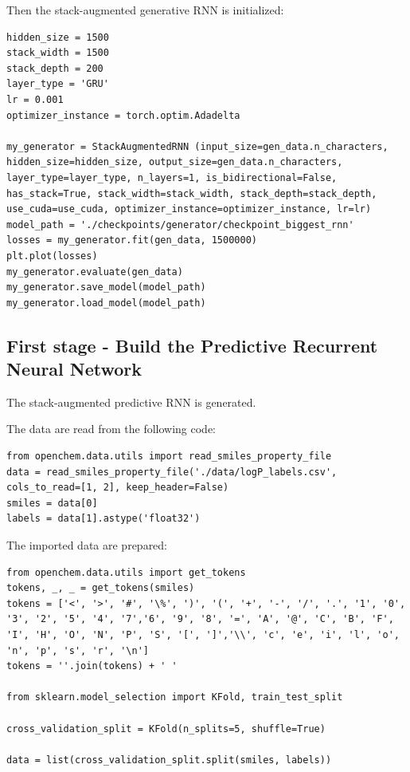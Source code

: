 \documentclass[a4paper]{article}
\begin{document}
Then the stack-augmented generative RNN is initialized:

\begin{lstlisting}
hidden_size = 1500
stack_width = 1500
stack_depth = 200
layer_type = 'GRU'
lr = 0.001
optimizer_instance = torch.optim.Adadelta

my_generator = StackAugmentedRNN (input_size=gen_data.n_characters, hidden_size=hidden_size, output_size=gen_data.n_characters, layer_type=layer_type, n_layers=1, is_bidirectional=False, has_stack=True, stack_width=stack_width, stack_depth=stack_depth, use_cuda=use_cuda, optimizer_instance=optimizer_instance, lr=lr)
model_path = './checkpoints/generator/checkpoint_biggest_rnn'
losses = my_generator.fit(gen_data, 1500000)
plt.plot(losses)
my_generator.evaluate(gen_data)
my_generator.save_model(model_path)
my_generator.load_model(model_path)
\end{lstlisting}

\subsection{First stage - Build the Predictive Recurrent Neural Network}\label{sec:First stage - Build the Predictive Recurrent Neural Network}

The stack-augmented predictive RNN is generated. 

The data are read from the following code:

\begin{lstlisting}
from openchem.data.utils import read_smiles_property_file
data = read_smiles_property_file('./data/logP_labels.csv', cols_to_read=[1, 2], keep_header=False)
smiles = data[0]
labels = data[1].astype('float32')
\end{lstlisting}

The imported data are prepared:

\begin{lstlisting}
from openchem.data.utils import get_tokens
tokens, _, _ = get_tokens(smiles)
tokens = ['<', '>', '#', '\%', ')', '(', '+', '-', '/', '.', '1', '0', '3', '2', '5', '4', '7','6', '9', '8', '=', 'A', '@', 'C', 'B', 'F', 'I', 'H', 'O', 'N', 'P', 'S', '[', ']','\\', 'c', 'e', 'i', 'l', 'o', 'n', 'p', 's', 'r', '\n']
tokens = ''.join(tokens) + ' '

from sklearn.model_selection import KFold, train_test_split

cross_validation_split = KFold(n_splits=5, shuffle=True)

data = list(cross_validation_split.split(smiles, labels))
\end{lstlisting}
\end{document}
